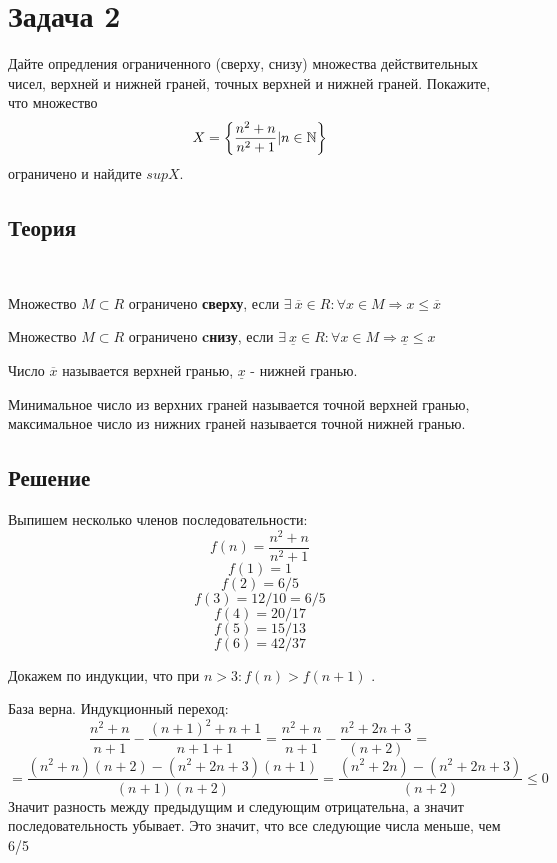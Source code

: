 \section*{Задача 2}

Дайте опредления ограниченного (сверху, снизу) множества действительных чисел, верхней и нижней граней, точных верхней и нижней граней. Покажите, что множество 
\[
X = \left\{ \frac{n^2 + n}{n^2 + 1}| n \in \mathbb{N} \right\}
\]
ограничено и найдите $sup X$.

\subsection*{Теория}

\begin{definition}
	\
	
	Множество $M \subset R$ ограничено \textbf{сверху}, если $\exists \ \overline{x} \in R: \forall x \in M \Rightarrow   x \leq \overline{x}$

	Множество $M \subset R$ ограничено \textbf{cнизу}, если $\exists \ \underline{x} \in R: \forall x \in M \Rightarrow   \underline{x} \leq x$
	
	Число $\overline{x}$ называется верхней гранью, $\underline{x}$ - нижней гранью.
	
	Минимальное число из верхних граней называется точной верхней гранью, максимальное число из нижних граней называется точной нижней гранью.
\end{definition}


\subsection*{Решение}
Выпишем несколько членов последовательности:
\[
f(n) = \frac{n^2 + n}{n^2 + 1}
\]
\[
f(1) = 1
\]
\[
f(2) = 6/5
\]
\[
f(3) = 12/10 = 6/5
\]
\[
f(4) = 20/17
\]
\[
f(5) = 15/13
\]
\[
f(6) = 42/37
\]

Докажем по индукции, что при $n > 3: f(n) > f(n + 1)$ .

База верна. Индукционный переход:
\[
\frac{n^2 + n}{n + 1} - \frac{(n+1)^2 + n + 1}{n + 1 + 1} 
=
\frac{n^2 + n}{n + 1} - \frac{n^2 + 2n + 3}{(n + 2)}
=
\]
\[
=
\frac{(n^2 + n)(n + 2) - (n^2 + 2n + 3)(n + 1)}{(n + 1)(n + 2)}
=
\frac{(n^2 + 2n) - (n^2 + 2n + 3)}{(n + 2)} \leqslant 0
\]
Значит разность между предыдущим и следующим отрицательна, а значит последовательность убывает. Это значит, что все следующие числа меньше, чем 6/5
